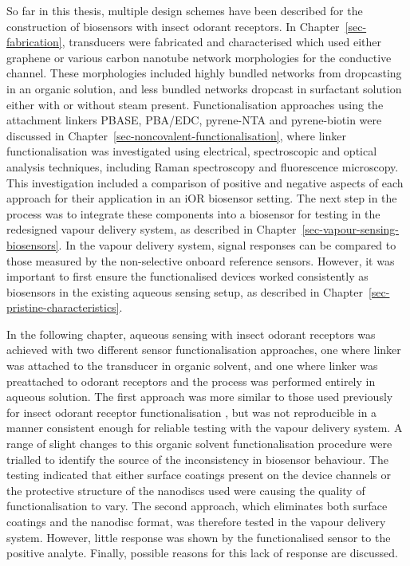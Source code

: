 \documentclass[
  a4paper,
]{scrbook}
\begin{document}
So far in this thesis, multiple design schemes have been described for
the construction of biosensors with insect odorant receptors. In
Chapter~\ref{sec-fabrication}, transducers were fabricated and
characterised which used either graphene or various carbon nanotube
network morphologies for the conductive channel. These morphologies
included highly bundled networks from dropcasting in an organic
solution, and less bundled networks dropcast in surfactant solution
either with or without steam present. Functionalisation approaches using
the attachment linkers PBASE, PBA/EDC, pyrene-NTA and pyrene-biotin were
discussed in Chapter~\ref{sec-noncovalent-functionalisation}, where
linker functionalisation was investigated using electrical,
spectroscopic and optical analysis techniques, including Raman
spectroscopy and fluorescence microscopy. This investigation included a
comparison of positive and negative aspects of each approach for their
application in an iOR biosensor setting. The next step in the process
was to integrate these components into a biosensor for testing in the
redesigned vapour delivery system, as described in
Chapter~\ref{sec-vapour-sensing-biosensors}. In the vapour delivery
system, signal responses can be compared to those measured by the
non-selective onboard reference sensors. However, it was important to
first ensure the functionalised devices worked consistently as
biosensors in the existing aqueous sensing setup, as described in
Chapter~\ref{sec-pristine-characteristics}.

In the following chapter, aqueous sensing with insect odorant receptors
was achieved with two different sensor functionalisation approaches, one
where linker was attached to the transducer in organic solvent, and one
where linker was preattached to odorant receptors and the process was
performed entirely in aqueous solution. The first approach was more
similar to those used previously for insect odorant receptor
functionalisation \autocite{Murugathas2019a,Murugathas2020}, but was not
reproducible in a manner consistent enough for reliable testing with the
vapour delivery system. A range of slight changes to this organic
solvent functionalisation procedure were trialled to identify the source
of the inconsistency in biosensor behaviour. The testing indicated that
either surface coatings present on the device channels or the protective
structure of the nanodiscs used were causing the quality of
functionalisation to vary. The second approach, which eliminates both
surface coatings and the nanodisc format, was therefore tested in the
vapour delivery system. However, little response was shown by the
functionalised sensor to the positive analyte. Finally, possible reasons
for this lack of response are discussed.
\end{document}
